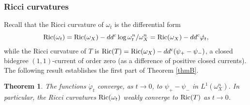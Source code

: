 \documentclass[a4paper,11pt,leqno,english]{smfart}
\theoremstyle{plain}
\newtheorem{thm}{Theorem}[section]
\theoremstyle{plain}
\numberwithin{equation}{section} %
\numberwithin{figure}{section} %
\theoremstyle{plain}
\theoremstyle{plain}
\theoremstyle{remark}
\theoremstyle{remark}
\theoremstyle{definition}
\theoremstyle{plain}
\theoremstyle{plain}
\theoremstyle{definition}
\newcommand{\f}{\varphi}
\newcommand{\p}{\psi}
\begin{document}
\subsubsection{Ricci curvatures}

Recall that the Ricci curvature of $\omega_t$ is the differential form
$$
{\rm Ric}(\omega_t)={\rm Ric}(\omega_X)-dd^c \log \omega_t^n/\omega_X^n={\rm Ric}(\omega_X)-dd^c \dot{\f_t},
$$
while the Ricci curvature of $T$ is ${\rm Ric}(T)={\rm Ric}(\omega_X)-dd^c (\p_+-\p_-)$,
a closed bidegree $(1,1)$-current of order zero
(as a difference of positive closed currents). The following result establishes the first part of Theorem \ref{thmB}.

\begin{thm} \label{thm:cvricci}
The functions $\dot{\f}_t$ converge, as $t \rightarrow 0$, to $\p_+-\p_-$ in $L^1(\omega_X^n)$. In particular, the Ricci curvatures ${\rm Ric}(\omega_t)$ weakly converge to ${\rm Ric}(T)$ as $t \rightarrow 0$.
\end{thm}
\end{document}
